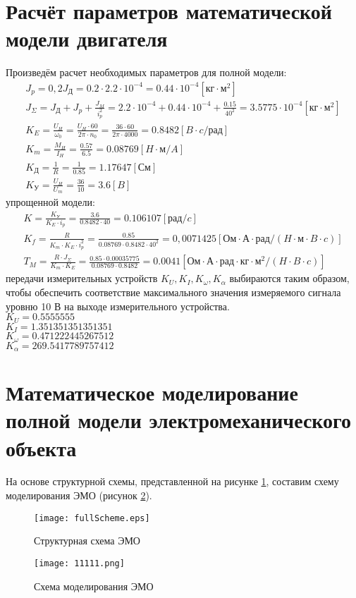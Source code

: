 \documentclass[12pt,a4paper]{article}
\begin{document}
\newpage
\section{Расчёт параметров математической модели двигателя}

Произведём расчет необходимых параметров для полной модели:
\begin{gather}
    J_p = 0,2J_\text{Д} = 0.2 \cdot 2.2\cdot10^{-4} = 0.44\cdot10^{-4} [\text{кг}\cdot\text{м}^2]\\
    J_\Sigma = J_\text{Д} + J_p + \frac{J_M}{i_p^2} = 2.2\cdot10^{-4} + 0.44\cdot10^{-4} + \frac{0.15}{40^2} = 3.5775\cdot10^{-4} [\text{кг}\cdot\text{м}^2]\\
    K_E = \frac{U_H}{\omega_0} = \frac{U_H\cdot60}{2\pi\cdot n_0} = \frac{36\cdot60}{2\pi\cdot4000} = 0.8482 [B\cdot c/\text{рад}]\\
    K_m = \frac{M_H}{I_H} = \frac{0.57}{6.5} = 0.08769 [H\cdot\text{м}/A]\\
    K_\text{Д} = \frac{1}{R} = \frac{1}{0.85} = 1.17647 [\text{См}]\\
    K_\text{У} = \frac{U_H}{U_m} = \frac{36}{10} = 3.6 [B]
\end{gather}
 упрощенной модели:
\begin{gather}
	K = \frac{K_\text{У}}{K_E\cdot i_p} = \frac{3.6}{0.8482 \cdot 40} = 0.106107 [\text{рад}/c]\\
	K_f = \frac{R}{K_m\cdot K_E\cdot i_p^2} = \frac{0.85}{0.08769\cdot0.8482\cdot40^2} = 0,0071425 [\text{Ом$\cdot$А$\cdot$рад}/(H\cdot\text{м}\cdot B\cdot c)]\\
	T_M = \frac{R\cdot J_\Sigma}{K_m\cdot K_E} = \frac{0.85\cdot0.00035775}{0.08769\cdot0.8482} = 0.0041[\text{Ом$\cdot$А$\cdot$рад$\cdot$кг$\cdot$м$^2$}/(H\cdot B \cdot c)]
\end{gather}
 передачи измерительных устройств $K_U, K_I, K_\omega, K_\alpha$ выбираются таким образом, чтобы обеспечить соответствие максимального значения измеряемого сигнала уровню 10 В на выходе измерительного устройства.\\ 
$K_U = 0.5555555$\\
$K_I = 1.351351351351351$\\
$K_\omega = 0.471222445267512$\\
$K_\alpha = 269.5417789757412$


\newpage
\section{Математическое моделирование полной модели электромеханического объекта}	 
На основе структурной схемы, представленной на рисунке \ref{fullScheme}, составим схему моделирования ЭМО (рисунок \ref{cxema1}).
\begin{figure}[ht!]
	\centering
	\texttt{[image: fullScheme.eps]}
	\caption{Структурная схема ЭМО}
	\label{fullScheme}
\end{figure}
\begin{figure}[ht!]
	\centering
	\texttt{[image: 11111.png]}
	\caption{Схема моделирования ЭМО}
	\label{cxema1}
\end{figure}
\end{document}
